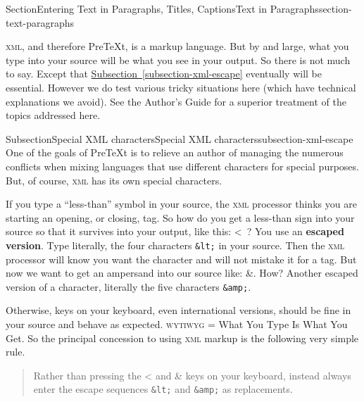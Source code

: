 \documentclass[twoside,10pt,]{article}
\newcommand{\xreffont}{\relax}
\newcommand{\mono}[1]{\texttt{#1}}
\newcommand{\initialism}[1]{\textsc{\MakeLowercase{#1}}}
\DeclareRobustCommand{\initialismintitle}[1]{\texorpdfstring{#1}{#1}}
\newcommand{\terminology}[1]{\textbf{#1}}
\numberwithin{equation}{section}
\begin{document}
\begin{sectionptx}{Section}{Entering Text in Paragraphs, Titles, Captions}{}{Text in Paragraphs}{}{}{section-text-paragraphs}
\begin{introduction}{}%
\initialism{XML}, and therefore PreTeXt, is a markup language.  But by and large, what you type into your source will be what you see in your output.  So there is not much to say.  Except that \hyperref[subsection-xml-escape]{Subsection~{\xreffont\ref{subsection-xml-escape}}} eventually will be essential.  However we do test various tricky situations here (which have technical explanations we avoid).  See the Author's Guide for a superior treatment of the topics addressed here.%
\end{introduction}%
%
%
\typeout{************************************************}
\typeout{Subsection 9.1 Special \initialismintitle{XML} characters}
\typeout{************************************************}
%
\begin{subsectionptx}{Subsection}{Special \initialismintitle{XML} characters}{}{Special \initialismintitle{XML} characters}{}{}{subsection-xml-escape}
One of the goals of PreTeXt is to relieve an author of managing the numerous conflicts when mixing languages that use different characters for special purposes.  But, of course, \initialism{XML} has its own special characters.%
\par
If you type a ``less-than'' symbol in your source, the \initialism{XML} processor thinks you are starting an opening, or closing, tag.  So how do you get a less-than sign into your source so that it survives into your output, like this: \textless{}~?  You use an \terminology{escaped version}.  Type literally, the four characters \mono{\&lt;} in your source.  Then the \initialism{XML} processor will know you want the character and will not mistake it for a tag.  But now we want to get an ampersand into our source like: \&.  How?  Another escaped version of a character, literally the five characters \mono{\&amp;}.%
\par
Otherwise, keys on your keyboard, even international versions, should be fine in your source and behave as expected.  \initialism{WYTIWYG} = What You Type Is What You Get.  So the principal concession to using \initialism{XML} markup is the following very simple rule.%
\begin{quote}%
Rather than pressing the \textless{} and \& keys on your keyboard, instead always enter the escape sequences \mono{\&lt;} and \mono{\&amp;} as replacements.%
\end{quote}

\end{subsectionptx}
\end{sectionptx}
\end{document}
